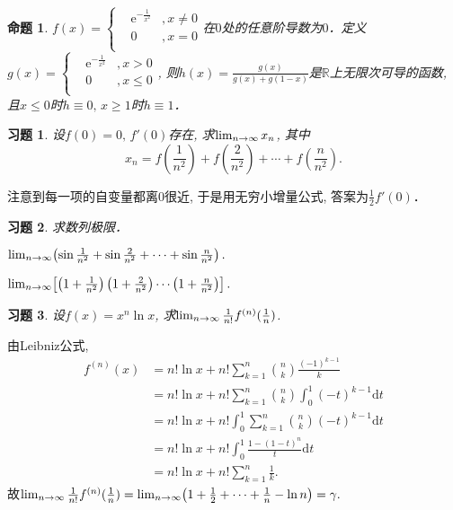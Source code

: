 \documentclass[11pt,a4paper]{ctexart}
\makeatletter
\theoremstyle{thmseries} %
\newtheorem{prop}{命题}[section]
\theoremstyle{exerseries}
\newtheorem{exer}{习题}[section]
\renewenvironment{proof}[1][\proofname]{\par
  \pushQED{\qed}%
  \normalfont \topsep6\p@\@plus6\p@\relax
  \trivlist
  \item[\hskip\labelsep
        \itshape
    #1\@addpunct{}]\ignorespaces
}{%
  \popQED\endtrivlist\@endpefalse
}
\newenvironment{sol}{\begin{proof}[\bfseries\upshape 解\quad]}{\end{proof}}
\newcommand{\bra}[1]{\mathopen{}\left(#1\right)}
\newcommand{\sbra}[1]{\mathopen{}\left[#1\right]}
\newcommand{\R}{\mathbb{R}}
\renewcommand{\d}{\mathrm{d}}
\newcommand{\e}{\mathrm{e}}
\def \nti {\mathnormal{n}\to\infty}
\makeatother
\begin{document}
\begin{prop}
	$f(x)=\left\{\begin{aligned}
		&\e^{-\frac{1}{x^2}}&,x\neq0\\
		&0&,x=0\\
	\end{aligned}\right.$在$0$处的任意阶导数为$0$．定义$g(x)=\left\{\begin{aligned}
		&\e^{-\frac{1}{x^2}}&,x>0\\
		&0&,x\leq0\\
	\end{aligned}\right.$, 则$h(x)=\frac{g(x)}{g(x)+g(1-x)}$是$\R$上无限次可导的函数, 且$x\leq0$时$h\equiv0,\,x\geq1$时$h\equiv1$．
\end{prop}

\begin{exer}
	设$f(0)=0,\,f'(0)$存在, 求$\lim_{\nti}x_n$, 其中
	\[x_n=f\bra{\frac{1}{n^2}}+f\bra{\frac{2}{n^2}}+\cdots+f\bra{\frac{n}{n^2}}.\]
\end{exer}
\begin{sol}
	注意到每一项的自变量都离$0$很近, 于是用无穷小增量公式, 答案为$\frac{1}{2}f'(0)$．
\end{sol}

\begin{exer}
	求数列极限．
	\begin{enumerate}
	\end{enumerate}
\end{exer}

\begin{exer}
	设$f(x)=x^n\ln x$, 求$\lim_{\nti}\frac{1}{n!}f^{(n)}(\frac{1}{n})$.
\end{exer}
\begin{sol}
	由Leibniz公式, 
	\begin{align*}
		f^{(n)}(x)&=n!\ln x+n!\sum_{k=1}^{n}\binom{n}{k}\frac{(-1)^{k-1}}{k}\\
		&=n!\ln x+n!\sum_{k=1}^{n}\binom{n}{k}\int_{0}^{1}(-t)^{k-1}\d t\\
		&=n!\ln x+n!\int_{0}^{1}\sum_{k=1}^{n}\binom{n}{k}(-t)^{k-1}\d t\\
		&=n!\ln x+n!\int_{0}^{1}\frac{1-(1-t)^n}{t}\d t\\
		&=n!\ln x+n!\sum_{k=1}^{n}\frac{1}{k}.
	\end{align*}
	故$\lim_{\nti}\frac{1}{n!}f^{(n)}(\frac{1}{n})=\lim_{\nti}\bra{1+\frac{1}{2}+\cdots+\frac{1}{n}-\ln n}=\gamma.$
\end{sol}
\end{document}
